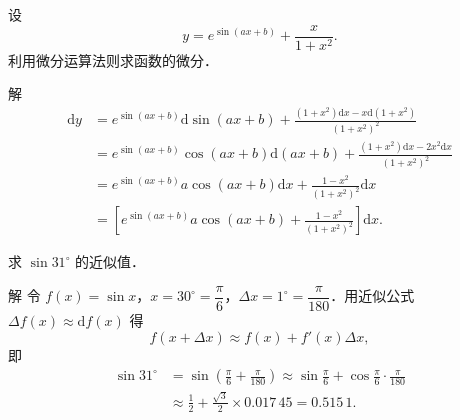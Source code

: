 \begin{example}\label{ex:4-2-4}
设
\[
y=e^{\sin(ax+b)}+\frac{x}{1+x^{2}}.
\]
利用微分运算法则求函数的微分．

解
\[
\begin{aligned}
\mathrm{d}y&=e^{\sin(ax+b)}\mathrm{d}\sin(ax+b)+\frac{(1+x^{2})\mathrm{d}x-x\mathrm{d}(1+x^{2})}{(1+x^{2})^{2}}\\
&=e^{\sin(ax+b)}\cos(ax+b)\mathrm{d}(ax+b)+\frac{(1+x^{2})\mathrm{d}x-2x^{2}\mathrm{d}x}{(1+x^{2})^{2}}\\
&=e^{\sin(ax+b)}a\cos(ax+b)\mathrm{d}x+\frac{1-x^{2}}{(1+x^{2})^{2}}\mathrm{d}x\\
&=\left[e^{\sin(ax+b)}a\cos(ax+b)+\frac{1-x^{2}}{(1+x^{2})^{2}}\right]\mathrm{d}x.
\end{aligned}
\]
\end{example}

\begin{example}\label{ex:4-2-5}
求 $\sin 31^{\circ}$ 的近似值．

解 令 $f(x)=\sin x$，$x=30^{\circ}=\dfrac{\pi}{6}$，$\Delta x=1^{\circ}=\dfrac{\pi}{180}$．用近似公式 $\Delta f(x)\approx\mathrm{d}f(x)$ 得
\[
f(x+\Delta x)\approx f(x)+f'(x)\Delta x,
\]
即
\[
\begin{aligned}
\sin 31^{\circ}&=\sin\left(\frac{\pi}{6}+\frac{\pi}{180}\right)\approx\sin\frac{\pi}{6}+\cos\frac{\pi}{6}\cdot\frac{\pi}{180}\\
&\approx\frac{1}{2}+\frac{\sqrt{3}}{2}\times0.017\,45=0.515\,1.
\end{aligned}
\]
\end{example}

